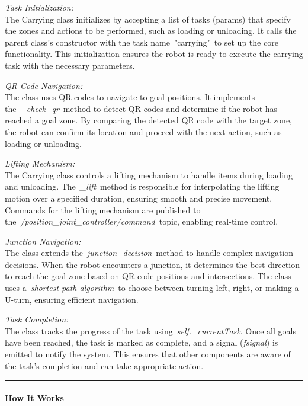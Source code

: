 \documentclass[a4paper,12pt]{extreport}
\begin{document}
\emph{Task Initialization:}\\
The Carrying class initializes by accepting a list of tasks (params)
that specify the zones and actions to be performed, such as loading or
unloading. It calls the parent class's constructor with the task
name~"carrying"~to set up the core functionality. This initialization
ensures the robot is ready to execute the carrying task with the
necessary parameters.

\emph{QR Code Navigation:}\\
The class uses QR codes to navigate to goal positions. It implements
the~\emph{\_check\_qr}~method to detect QR codes and determine if the
robot has reached a goal zone. By comparing the detected QR code with
the target zone, the robot can confirm its location and proceed with the
next action, such as loading or unloading.

\emph{Lifting Mechanism:}\\
The Carrying class controls a lifting mechanism to handle items during
loading and unloading. The~\emph{\_lift}~method is responsible for
interpolating the lifting motion over a specified duration, ensuring
smooth and precise movement. Commands for the lifting mechanism are
published to the~\emph{/position\_joint\_controller/command}~topic,
enabling real-time control.

\emph{Junction Navigation:}\\
The class extends the~\emph{junction\_decision}~method to handle complex
navigation decisions. When the robot encounters a junction, it
determines the best direction to reach the goal zone based on QR code
positions and intersections. The class uses a~\emph{shortest path
algorithm}~to choose between turning left, right, or making a U-turn,
ensuring efficient navigation.

\emph{Task Completion:}\\
The class tracks the progress of the task
using~\emph{self.\_currentTask}. Once all goals have been reached, the
task is marked as complete, and a signal (\emph{fsignal}) is emitted to
notify the system. This ensures that other components are aware of the
task's completion and can take appropriate action.

\begin{center}\rule{0.5\linewidth}{0.5pt}\end{center}

\paragraph{How It Works}
\end{document}
